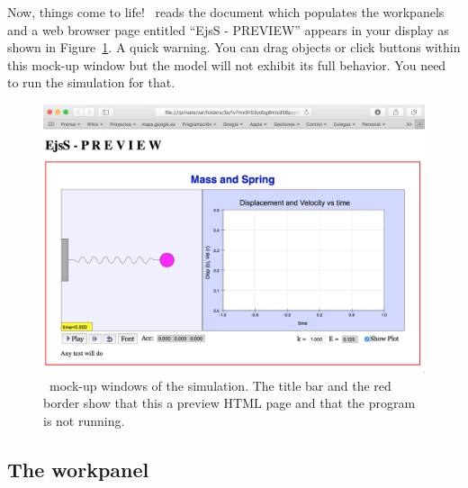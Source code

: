 Now, things come to life! \ejs\ reads the  document which populates the workpanels and a web browser page entitled 
``EjsS - PREVIEW'' appears in your display as shown in Figure~\ref{fig:03ExplorationJavascript/SpringInterface}. A quick warning. You
can drag objects or click buttons within this mock-up window but the model will not exhibit its full behavior. You need to run the simulation for that.

\begin{figure}[htb]
  \centering
  \includegraphics[scale=\scale]{03ExplorationJavascript/images/SpringInterface.png}
  \caption{\ejs\ mock-up windows of the  simulation. The title bar and the red border show that this a preview HTML page and that the program is not running.}
  \label{fig:03ExplorationJavascript/SpringInterface}
\end{figure}


\subsection{The  workpanel}

